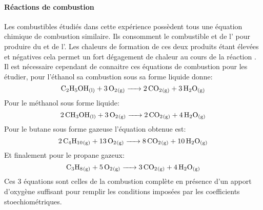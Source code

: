 \paragraph*{Réactions de combustion}
Les combustibles étudiés dans cette expérience possèdent tous une équation chimique de combustion similaire. Ils consomment le combustible et de l' pour produire du  et de l'. Les chaleurs de formation de ces deux produits étant élevées et négatives cela permet un fort dégagement de chaleur au cours de la réaction \cite{notice}. Il est nécessaire cependant de connaitre ces équations de combustion pour les étudier, pour l'éthanol  sa combustion sous sa forme liquide donne:
\begin{equation}
    \ce{ C_2H_5OH_{(l)} + 3O_2_{(g)} -> 2CO_2_{(g)} + 3H_2O_{(g)} }
    \label{eq:ethanol_combustion}
\end{equation}
Pour le méthanol  sous forme liquide:
\begin{equation}
    \ce{ 2CH3OH_{(l)} + 3O_2_{(g)} -> 2CO_2_{(g)} + 4H_2O_{(g)} }
    \label{eq:methanol_combustion}
\end{equation}
Pour le butane  sous forme gazeuse l'équation obtenue est:
\begin{equation}
    \ce{ 2C_4H_{10}_{(g)} + 13O_2_{(g)} -> 8CO_2_{(g)} + 10H_2O_{(g)} }
    \label{eq:butane_combustion}
\end{equation}
Et finalement pour le propane  gazeux:
\begin{equation}
    \ce{ C_3H_8_{(g)} + 5O_2_{(g)} -> 3CO_2_{(g)} + 4H_2O_{(g)} }
    \label{eq:propane_combustion}
\end{equation}
Ces 3 équations sont celles de la combustion complète en présence d'un apport d'oxygène suffisant pour remplir les conditions imposées par les coefficients stoechiométriques.

